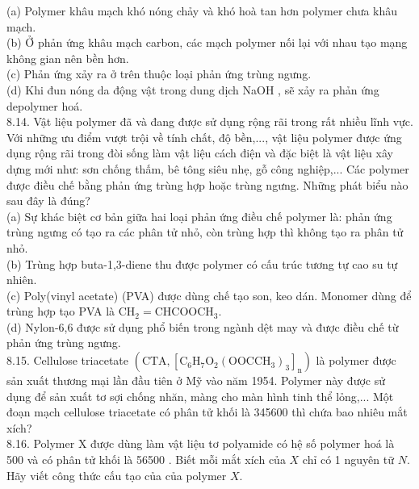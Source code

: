 \documentclass[10pt]{article}
\begin{document}
(a) Polymer khâu mạch khó nóng chảy và khó hoà tan hơn polymer chưa khâu mạch.\\
(b) Ở phản ứng khâu mạch carbon, các mạch polymer nối lại với nhau tạo mạng không gian nên bền hơn.\\
(c) Phản ứng xảy ra ở trên thuộc loại phản ứng trùng ngưng.\\
(d) Khi đun nóng da động vật trong dung dịch NaOH , sẽ xảy ra phản ứng depolymer hoá.\\
8.14. Vật liệu polymer đã và đang được sử dụng rộng rãi trong rất nhiều lĩnh vực. Với những ưu điểm vượt trội về tính chất, độ bền,..., vật liệu polymer được ứng dụng rộng rãi trong đòi sống làm vật liệu cách điện và đặc biệt là vật liệu xây dựng mới như: sơn chống thấm, bê tông siêu nhẹ, gỗ công nghiệp,... Các polymer được điều chế bằng phản ứng trùng hợp hoặc trùng ngưng. Những phát biểu nào sau đây là đúng?\\
(a) Sự khác biệt cơ bản giữa hai loại phản ứng điều chế polymer là: phản ứng trùng ngưng có tạo ra các phân tử nhỏ, còn trùng hợp thì không tạo ra phân tử nhỏ.\\
(b) Trùng hợp buta-1,3-diene thu được polymer có cấu trúc tương tự cao su tự nhiên.\\
(c) Poly(vinyl acetate) (PVA) được dùng chế tạo son, keo dán. Monomer dùng để trùng hợp tạo PVA là $\mathrm{CH}_{2}=\mathrm{CHCOOCH}_{3}$.\\
(d) Nylon-6,6 được sử dụng phổ biến trong ngành dệt may và được điều chế từ phản ứng trùng ngưng.\\
8.15. Cellulose triacetate $\left(\mathrm{CTA},\left[\mathrm{C}_{6} \mathrm{H}_{7} \mathrm{O}_{2}\left(\mathrm{OOCCH}_{3}\right)_{3}\right]_{\mathrm{n}}\right)$ là polymer được sản xuất thương mại lần đầu tiên ở Mỹ vào năm 1954. Polymer này được sử dụng để sản xuất tơ sợi chống nhăn, màng cho màn hình tinh thể lỏng,... Một đoạn mạch cellulose triacetate có phân tử khối là 345600 thì chứa bao nhiêu mắt xích?\\
8.16. Polymer X được dùng làm vật liệu tơ polyamide có hệ số polymer hoá là 500 và có phân tử khối là 56500 . Biết mỗi mắt xích của $X$ chỉ có 1 nguyên tữ $N$. Hãy viết công thức cấu tạo của của polymer $X$.
\end{document}
